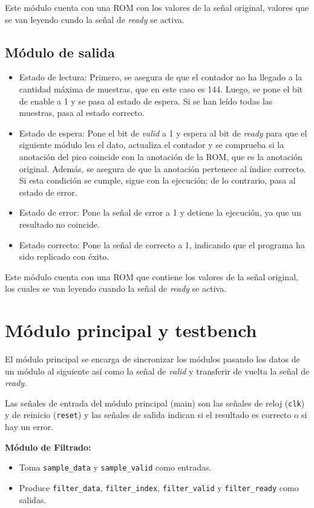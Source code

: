 Este módulo cuenta con una ROM con los valores de la señal original, valores que se van leyendo cundo la señal de \textit{ready} se activa.

\subsection{Módulo de salida}
\begin{itemize}
\item Estado de lectura: Primero, se asegura de que el contador no ha llegado a la cantidad máxima de muestras, que en este caso es 144. Luego, se pone el bit de enable a 1 y se pasa al estado de espera. Si se han leído todas las muestras, pasa al estado correcto.
\item Estado de espera: Pone el bit de \textit{valid} a 1 y espera al bit de \textit{ready} para que el siguiente módulo lea el dato, actualiza el contador y se comprueba si la anotación del pico coincide con la anotación de la ROM, que es la anotación original. Además, se asegura de que la anotación pertenece al índice correcto. Si esta condición se cumple, sigue con la ejecución; de lo contrario, pasa al estado de error.
\item Estado de error: Pone la señal de error a 1 y detiene la ejecución, ya que un resultado no coincide.
\item Estado correcto: Pone la señal de correcto a 1, indicando que el programa ha sido replicado con éxito.
\end{itemize}

Este módulo cuenta con una ROM que contiene los valores de la señal original, los cuales se van leyendo cuando la señal de \textit{ready} se activa.
\section{Módulo principal y testbench}

El módulo principal se encarga de sincronizar los módulos pasando los datos de un módulo al siguiente así como la señal de \textit{valid} y transferir de vuelta la señal de \textit{ready}.

Las señales de entrada del módulo principal (main) son las señales de reloj (\texttt{clk}) y de reinicio (\texttt{reset}) y las señales de salida indican si el resultado es correcto o si hay un error.

\textbf{Módulo de Filtrado:}
\begin{itemize}
    \item Toma \texttt{sample\_data} y \texttt{sample\_valid} como entradas.
    \item Produce \texttt{filter\_data}, \texttt{filter\_index}, \texttt{filter\_valid} y \texttt{filter\_ready} como salidas.
\end{itemize}

